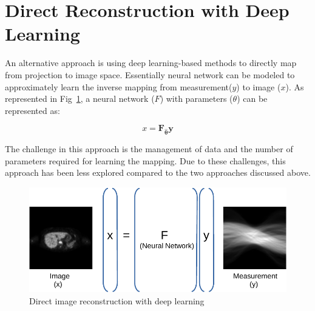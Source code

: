 \section{Direct Reconstruction with Deep Learning}

An alternative approach is using deep learning-based methods to directly map from projection to image space. Essentially neural network can be modeled to approximately learn  the inverse mapping from measurement($y$) to image ($x$). As represented in Fig~\ref{fig:direct}, a neural network ($F$) with parameters ($\theta$) can be represented as:

\begin{equation}\label{eq:direct}
x=\boldsymbol{F}_{\widehat{\boldsymbol{\theta}}} \boldsymbol{y}
\end{equation}

The challenge in this approach is the management of data and the number of parameters required for learning the mapping. Due to these challenges, this approach has been less explored compared to the two approaches discussed above. 


\begin{figure}[!htbp]
	\centering
	\includegraphics[width=0.8\linewidth]{./Figures/direct-crop.pdf}
	\caption{Direct image reconstruction with deep learning}
	\label{fig:direct}
\end{figure}


